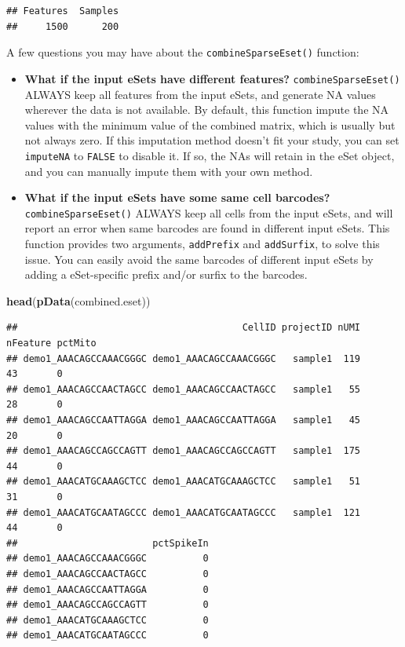 \documentclass[
  12pt,
]{book}
\newenvironment{Shaded}{\begin{snugshade}}{\end{snugshade}}
\newcommand{\FunctionTok}[1]{\textcolor[rgb]{0.13,0.29,0.53}{\textbf{#1}}}
\newcommand{\NormalTok}[1]{#1}
\providecommand{\tightlist}{%
  \setlength{\itemsep}{0pt}\setlength{\parskip}{0pt}}
\begin{document}
\begin{verbatim}
## Features  Samples 
##     1500      200
\end{verbatim}

A few questions you may have about the \texttt{combineSparseEset()} function:

\begin{itemize}
\tightlist
\item
  \textbf{What if the input eSets have different features?} \texttt{combineSparseEset()} ALWAYS keep all features from the input eSets, and generate NA values wherever the data is not available. By default, this function impute the NA values with the minimum value of the combined matrix, which is usually but not always zero. If this imputation method doesn't fit your study, you can set \texttt{imputeNA} to \texttt{FALSE} to disable it. If so, the NAs will retain in the eSet object, and you can manually impute them with your own method.
\item
  \textbf{What if the input eSets have some same cell barcodes?} \texttt{combineSparseEset()} ALWAYS keep all cells from the input eSets, and will report an error when same barcodes are found in different input eSets. This function provides two arguments, \texttt{addPrefix} and \texttt{addSurfix}, to solve this issue. You can easily avoid the same barcodes of different input eSets by adding a eSet-specific prefix and/or surfix to the barcodes.
\end{itemize}

\begin{Shaded}
\begin{Highlighting}[]
\FunctionTok{head}\NormalTok{(}\FunctionTok{pData}\NormalTok{(combined.eset))}
\end{Highlighting}
\end{Shaded}

\begin{verbatim}
##                                        CellID projectID nUMI nFeature pctMito
## demo1_AAACAGCCAAACGGGC demo1_AAACAGCCAAACGGGC   sample1  119       43       0
## demo1_AAACAGCCAACTAGCC demo1_AAACAGCCAACTAGCC   sample1   55       28       0
## demo1_AAACAGCCAATTAGGA demo1_AAACAGCCAATTAGGA   sample1   45       20       0
## demo1_AAACAGCCAGCCAGTT demo1_AAACAGCCAGCCAGTT   sample1  175       44       0
## demo1_AAACATGCAAAGCTCC demo1_AAACATGCAAAGCTCC   sample1   51       31       0
## demo1_AAACATGCAATAGCCC demo1_AAACATGCAATAGCCC   sample1  121       44       0
##                        pctSpikeIn
## demo1_AAACAGCCAAACGGGC          0
## demo1_AAACAGCCAACTAGCC          0
## demo1_AAACAGCCAATTAGGA          0
## demo1_AAACAGCCAGCCAGTT          0
## demo1_AAACATGCAAAGCTCC          0
## demo1_AAACATGCAATAGCCC          0
\end{verbatim}
\end{document}
